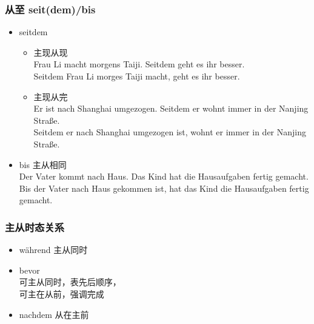 \subsubsection{从至 seit(dem)/bis}
\begin{itemize}
    \item seitdem \\
          \begin{itemize}
              \item 主现从现 \\
                    Frau Li macht morgens Taiji. Seitdem geht es ihr besser. \\
                    Seitdem Frau Li morges Taiji macht, geht es ihr besser.
              \item 主现从完 \\
                    Er ist nach Shanghai umgezogen. Seitdem er wohnt immer in der Nanjing Straße. \\
                    Seitdem er nach Shanghai umgezogen ist, wohnt er immer in der Nanjing Straße.
          \end{itemize}
    \item bis 主从相同 \\
          Der Vater kommt nach Haus. Das Kind hat die Hausaufgaben fertig gemacht. \\
          Bis der Vater nach Haus gekommen ist, hat das Kind die Hausaufgaben fertig gemacht.
\end{itemize}

\subsubsection{主从时态关系}
\begin{itemize}
    \item während 主从同时
    \item bevor \\
          可主从同时，表先后顺序，\\
          可主在从前，强调完成
    \item nachdem 从在主前
\end{itemize}

